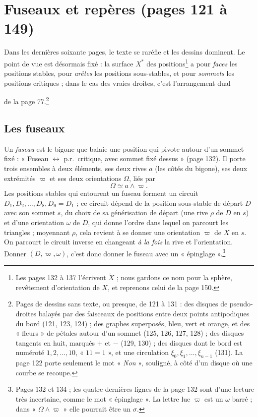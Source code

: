 \documentclass[11pt,a4paper]{article}
\begin{document}
\section*{Fuseaux et repères (pages 121 à 149)}

Dans les dernières soixante pages, le texte se raréfie et les dessins
dominent. Le point de vue est désormais fixé : la surface
$X^{*}$ des positions\footnote{Les pages 132 à 137 l'écrivent $\widetilde{X}$ ;
nous gardons ce nom pour la sphère, revêtement d'orientation de $X$, et
reprenons celui de la page 150.} a pour \emph{faces} les positions stables, pour
\emph{arêtes} les positions sous-stables, et pour \emph{sommets} les positions
critiques ; dans le cas des vraies droites, c'est l'arrangement dual

de la page 77.\footnote{Pages de dessins sans texte, ou presque, de 121 à 131 :
des disques de pseudo-droites balayés par des faisceaux de positions entre deux
points antipodiques du bord (121, 123, 124) ; des graphes superposés, bleu,
vert et orange, et des « fleurs » de pétales autour d'un sommet (125, 126, 127,
128) ; des disques tangents en huit, marqués $+$ et $-$ (129, 130) ; des disques
dont le bord est numéroté $1, 2, \ldots, 10$, « $11 = 1$ », et une circulation
$\xi_0, \xi_1, \ldots, \xi_{n-1}$ (131). La page 122 porte seulement le mot
« \emph{Non} », souligné, à côté d'un disque où une courbe se recoupe.}

\subsection*{Les fuseaux}

Un \emph{fuseau} est le bigone que balaie une position qui pivote autour d'un
sommet fixé : « Fuseau $\longleftrightarrow$ p.r.\ critique, avec sommet fixé
dessus » (page 132). Il porte trois ensembles à deux éléments, ses deux rives
$a$ (les côtés du bigone), ses deux extrémités $\varpi$ et ses deux orientations
$\Omega$, liés par
\[
\Omega \simeq a \wedge \varpi .
\]
Les positions stables qui entourent un fuseau forment un circuit $D_1, D_2,
\ldots, D_8, D_9 = D_1$ ; ce circuit dépend de la position sous-stable de départ
$D$ avec son sommet $s$, du choix de sa générisation de départ (une rive
$\rho$ de $D$ en $s$) et d'une orientation $\omega$ de $D$, qui donne l'ordre
dans lequel on parcourt les triangles ; moyennant $\rho$, cela revient à se
donner une orientation $\varpi$ de $X$ en $s$. On parcourt le circuit inverse en
changeant \emph{à la fois} la rive et l'orientation. Donner $(D, \varpi,
\omega)$, c'est donc donner le fuseau avec un « épinglage ».\footnote{Pages 132
et 134 ; les quatre dernières lignes de la page 132 sont d'une lecture très
incertaine, comme le mot « épinglage ». La lettre lue $\varpi$ est un $\omega$
barré ; dans « $\Omega \wedge \varpi$ » elle pourrait être un $\sigma$.}
\end{document}
